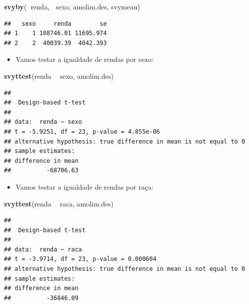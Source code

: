 \documentclass[]{book}
\newenvironment{Shaded}{\begin{snugshade}}{\end{snugshade}}
\newcommand{\KeywordTok}[1]{\textcolor[rgb]{0.13,0.29,0.53}{\textbf{#1}}}
\newcommand{\StringTok}[1]{\textcolor[rgb]{0.31,0.60,0.02}{#1}}
\newcommand{\OperatorTok}[1]{\textcolor[rgb]{0.81,0.36,0.00}{\textbf{#1}}}
\newcommand{\NormalTok}[1]{#1}
\providecommand{\tightlist}{%
  \setlength{\itemsep}{0pt}\setlength{\parskip}{0pt}}
\theoremstyle{definition}
\theoremstyle{definition}
\theoremstyle{definition}
\theoremstyle{remark}
\begin{document}
\begin{Shaded}
\begin{Highlighting}[]
\KeywordTok{svyby}\NormalTok{(}\OperatorTok{~}\NormalTok{renda, }\OperatorTok{~}\NormalTok{sexo, amolim.des, svymean)}
\end{Highlighting}
\end{Shaded}

\begin{verbatim}
##   sexo     renda        se
## 1    1 108746.01 11695.974
## 2    2  40039.39  4042.393
\end{verbatim}

\begin{itemize}
\tightlist
\item
  Vamos testar a igualdade de rendas por sexo:
\end{itemize}

\begin{Shaded}
\begin{Highlighting}[]
\KeywordTok{svyttest}\NormalTok{(renda }\OperatorTok{~}\StringTok{ }\NormalTok{sexo, amolim.des)}
\end{Highlighting}
\end{Shaded}

\begin{verbatim}
## 
##  Design-based t-test
## 
## data:  renda ~ sexo
## t = -5.9251, df = 23, p-value = 4.855e-06
## alternative hypothesis: true difference in mean is not equal to 0
## sample estimates:
## difference in mean 
##          -68706.63
\end{verbatim}

\begin{itemize}
\tightlist
\item
  Vamos testar a igualdade de rendas por raça:
\end{itemize}

\begin{Shaded}
\begin{Highlighting}[]
\KeywordTok{svyttest}\NormalTok{(renda }\OperatorTok{~}\StringTok{ }\NormalTok{raca, amolim.des)}
\end{Highlighting}
\end{Shaded}

\begin{verbatim}
## 
##  Design-based t-test
## 
## data:  renda ~ raca
## t = -3.9714, df = 23, p-value = 0.000604
## alternative hypothesis: true difference in mean is not equal to 0
## sample estimates:
## difference in mean 
##          -36846.09
\end{verbatim}
\end{document}
